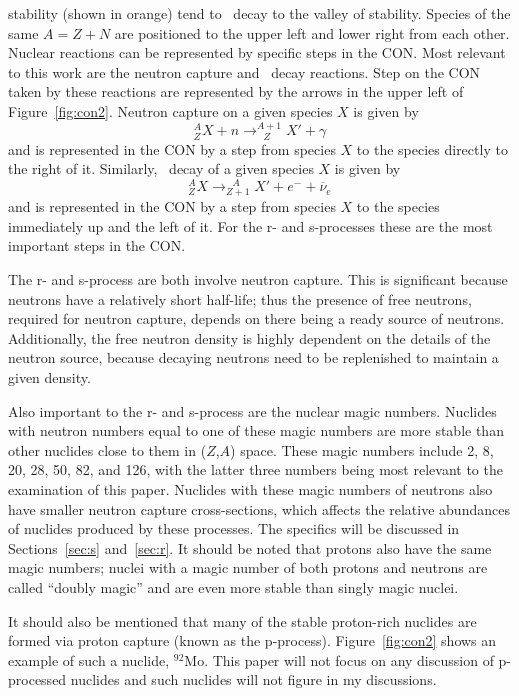 stability (shown in orange) tend to \bminus\ decay to the valley of
stability.  Species of the
same $A=Z+N$ are positioned to the upper left and lower right from
each other.  Nuclear reactions can be represented by specific steps in
the CON.  Most relevant to this work are the neutron
capture and \bminus\ decay reactions.  Step on the CON taken by these
reactions are represented by the arrows in the upper left of
Figure~\ref{fig:con2}.
  Neutron capture on a given
species $X$ is given by
\begin{equation}
\label{eq:nc}
^{A}_ZX + n \rightarrow ^{A+1}_{\ \ \ Z}X' + \gamma
\end{equation}
and is represented in the CON by a step from species $X$ to the
species directly to the right of it.  Similarly, \bminus\ decay of a
given species $X$ is given by
\begin{equation}
\label{eq:bd}
^{A}_ZX  \rightarrow ^{\ \ \ A}_{Z+1}X' + e^- + \overline{\nu}_e
\end{equation}
and is represented in the CON by a step from species $X$ to the
species immediately up and the left of it.  For the r- and s-processes
these are the most important steps in the CON.

The r- and s-process are both involve neutron capture.  This is
significant because neutrons have a relatively short half-life; thus
the presence of free neutrons, required for neutron capture, depends
on there being a ready source of neutrons.  Additionally, the free
neutron density is highly dependent on the details of the neutron
source, because decaying neutrons need to be replenished to maintain a
given density.

Also important to the r- and s-process are the nuclear magic numbers.
Nuclides with neutron numbers equal to one of these magic numbers are
more stable than other nuclides close to them in ($Z$,$A$) space.
These magic numbers include 2, 8, 20, 28, 50, 82, and 126, with the
latter three numbers being most relevant to the examination of this
paper.  Nuclides with these magic numbers of neutrons also have 
smaller neutron capture cross-sections, which affects the
relative abundances of nuclides produced by these processes.  The
specifics will be discussed in Sections~\ref{sec:s} and~\ref{sec:r}.
It should be noted that protons also have the same magic numbers;
nuclei with a magic number of both protons and neutrons are called
``doubly magic'' and are even more stable than singly magic nuclei.  

It should also be mentioned that many of the stable proton-rich
nuclides are formed via proton capture (known as the p-process).  
Figure~\ref{fig:con2} shows an example of such a nuclide, $^{92}$Mo.  This paper will not focus
on any discussion of p-processed nuclides and such nuclides will not
figure in my discussions.
